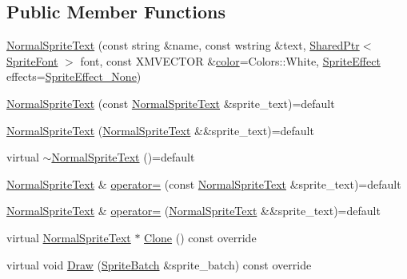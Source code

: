 \subsection*{Public Member Functions}
\begin{DoxyCompactItemize}
\item 
\hyperlink{classmage_1_1_normal_sprite_text_a7945df1946a1aa4df8b534a812b420fe}{Normal\+Sprite\+Text} (const string \&name, const wstring \&text, \hyperlink{namespacemage_a1e01ae66713838a7a67d30e44c67703e}{Shared\+Ptr}$<$ \hyperlink{classmage_1_1_sprite_font}{Sprite\+Font} $>$ font, const X\+M\+V\+E\+C\+T\+OR \&\hyperlink{namespacemage_a56eceea5a9bceb2b56073f3ea4945781}{color}=Colors\+::\+White, \hyperlink{namespacemage_a9cfe18123066ba4236f548f9de75d881}{Sprite\+Effect} effects=\hyperlink{namespacemage_a9cfe18123066ba4236f548f9de75d881af3c275fbfacfe174da928b2f24dfa515}{Sprite\+Effect\+\_\+\+None})
\item 
\hyperlink{classmage_1_1_normal_sprite_text_a3bd8f94a53caeb7ead9312da6b9b849a}{Normal\+Sprite\+Text} (const \hyperlink{classmage_1_1_normal_sprite_text}{Normal\+Sprite\+Text} \&sprite\+\_\+text)=default
\item 
\hyperlink{classmage_1_1_normal_sprite_text_ae16d982e1d959b6b80f82610b07ec15b}{Normal\+Sprite\+Text} (\hyperlink{classmage_1_1_normal_sprite_text}{Normal\+Sprite\+Text} \&\&sprite\+\_\+text)=default
\item 
virtual \hyperlink{classmage_1_1_normal_sprite_text_a5ead5607cb41849419827ff231b4ea9d}{$\sim$\+Normal\+Sprite\+Text} ()=default
\item 
\hyperlink{classmage_1_1_normal_sprite_text}{Normal\+Sprite\+Text} \& \hyperlink{classmage_1_1_normal_sprite_text_a1c0f30872c4d3114f1e53183958354e5}{operator=} (const \hyperlink{classmage_1_1_normal_sprite_text}{Normal\+Sprite\+Text} \&sprite\+\_\+text)=default
\item 
\hyperlink{classmage_1_1_normal_sprite_text}{Normal\+Sprite\+Text} \& \hyperlink{classmage_1_1_normal_sprite_text_a034dd8c1c084216a247896ffbe50e61d}{operator=} (\hyperlink{classmage_1_1_normal_sprite_text}{Normal\+Sprite\+Text} \&\&sprite\+\_\+text)=default
\item 
virtual \hyperlink{classmage_1_1_normal_sprite_text}{Normal\+Sprite\+Text} $\ast$ \hyperlink{classmage_1_1_normal_sprite_text_aef48e90667849cd9ec01510baf1394cb}{Clone} () const override
\item 
virtual void \hyperlink{classmage_1_1_normal_sprite_text_ad2a1b02bea18afd6bf61b106a727a355}{Draw} (\hyperlink{classmage_1_1_sprite_batch}{Sprite\+Batch} \&sprite\+\_\+batch) const override
\end{DoxyCompactItemize}
